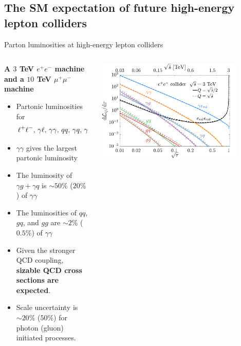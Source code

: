 \documentclass[aspectratio=169]{beamer}
\begin{document}
\subsection{The SM expectation of future high-energy lepton colliders}
\begin{frame}{Parton luminosities at high-energy lepton colliders}
	\begin{columns}
		\begin{column}{0.66\textwidth}
			\hspace{3mm}\textcolor{PittRoyal}{\bf A $3$ TeV $e^+e^-$ machine and a $10$ TeV $\mu^+\mu^-$ machine}
			\begin{itemize}
				\item Partonic luminosities for
				\begin{eqnarray}
					\ell^+\ell^-,\, \gamma\ell, \, \gamma\gamma,\, qq,\, \gamma q,\, \gamma g,\, gq,\ {\rm and}\ gg \nonumber
				\end{eqnarray}
				\item $\gamma \gamma$ gives the largest partonic luminosity
				\item The luminosity of $\gamma g + \gamma q$ is $\sim 50\%$ ($20\%$) of $\gamma \gamma$
				\item The luminosities of $qq$, $gq$, and $gg$ are $\sim 2\%$ ($0.5\%$) of $\gamma \gamma$
				\item Given the stronger QCD coupling, {\bf sizable QCD cross sections are expected}.
				\item Scale uncertainty is $\sim 20\%$ ($50\%$) for photon (gluon) initiated processes.
			\end{itemize}
		\end{column}
		\begin{column}{0.44\textwidth}
			\includegraphics[width=0.84\textwidth]{figs/lumi_e_3TeV}

\end{column}
\end{columns}
\end{frame}
\end{document}
